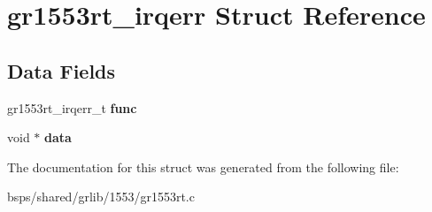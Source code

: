 \hypertarget{structgr1553rt__irqerr}{}\section{gr1553rt\+\_\+irqerr Struct Reference}
\label{structgr1553rt__irqerr}
\subsection*{Data Fields}
\begin{DoxyCompactItemize}
\item 
\mbox{\label{structgr1553rt__irqerr_a5646f46abb7ca9d66bb2354a3859f7b9}} 
gr1553rt\+\_\+irqerr\+\_\+t {\bfseries func}
\item 
\mbox{\label{structgr1553rt__irqerr_a8e79eb5d956c143e7488283b62661cf6}} 
void $\ast$ {\bfseries data}
\end{DoxyCompactItemize}


The documentation for this struct was generated from the following file\+:\begin{DoxyCompactItemize}
\item 
bsps/shared/grlib/1553/gr1553rt.\+c\end{DoxyCompactItemize}
